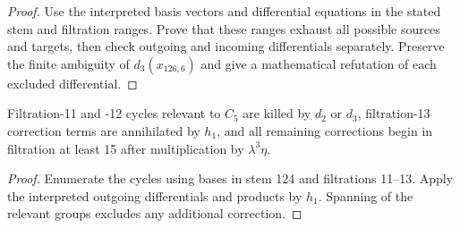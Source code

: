 \begin{proof}
  Use the interpreted basis vectors and differential equations in the
  stated stem and filtration ranges. Prove that these ranges exhaust all
  possible sources and targets, then check outgoing and incoming
  differentials separately. Preserve the finite ambiguity of $d_3(x_{126,6})$
  and give a mathematical refutation of each excluded differential.
\end{proof}

\begin{proposition}
  \label{evidence:near126-indeterminacy}
  \notready
  Filtration-11 and -12 cycles relevant
  to $C_5$ are killed by $d_2$ or $d_3$, filtration-13 correction terms are
  annihilated by $h_1$, and all remaining corrections begin in filtration at
  least 15 after multiplication by $\lambda^3\eta$.
\end{proposition}

\begin{proof}
  Enumerate the cycles using bases in stem 124 and filtrations 11--13.
  Apply the interpreted outgoing differentials and products by $h_1$.
  Spanning of the relevant groups excludes any additional correction.
\end{proof}

